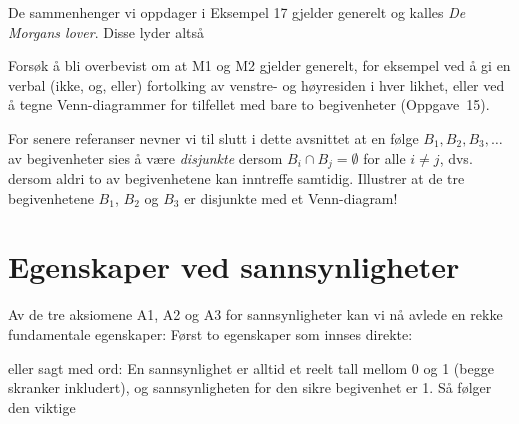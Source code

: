 De sammenhenger vi oppdager i Eksempel 17 gjelder generelt og
kalles {\em De Morgans lover}. Disse lyder altså

\begin{center}  \end{center}
\noindent Forsøk å bli overbevist om at M1 og M2 gjelder generelt, for
eksempel ved å gi en verbal (ikke, og, eller) fortolking av
venstre- og høyresiden i hver likhet, eller ved å tegne 
Venn-diagrammer for tilfellet med bare to begivenheter (Oppgave~15).

For senere referanser nevner vi til slutt i dette avsnittet at en
følge $B_1, B_2, B_3,\ldots$ av begivenheter sies å være {\em
disjunkte} dersom $B_i \cap B_j = \emptyset$ for alle $i \neq j$, dvs.
dersom aldri to av begivenhetene kan inntreffe samtidig.
Illustrer at de tre begivenhetene $B_1$, $B_2$ og $B_3$ er
disjunkte med et Venn-diagram!


\section{Egenskaper ved sannsynligheter}

Av de tre aksiomene A1, A2 og A3 for sannsynligheter kan vi nå
avlede en rekke fundamentale egenskaper: Først to egenskaper som
innses direkte:

\begin{center}  \end{center}
\noindent eller sagt med ord: En sannsynlighet er alltid et reelt tall
mellom 0 og 1 (begge skranker inkludert), og sannsynligheten for
den sikre begivenhet er 1. Så følger den viktige \\

